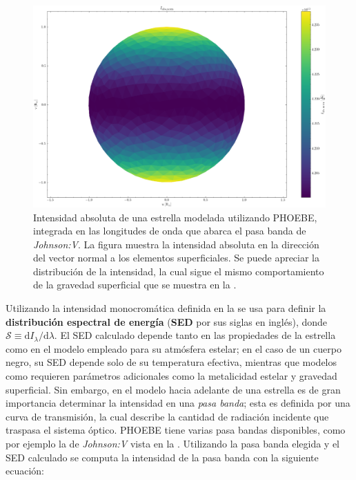 \begin{figure}[!ht]
	\centering
	\includegraphics[scale=0.4]{Introduccion/Figures/Figura PHOEBE Malla Intensidad Normal.png}
	\caption{Intensidad absoluta de una estrella modelada utilizando PHOEBE,
	integrada en las longitudes de onda que abarca el pasa banda de
	\textit{Johnson:V}. La figura muestra la intensidad absoluta en la dirección
	del vector normal a los elementos superficiales. Se puede apreciar la
	distribución de la intensidad, la cual sigue el mismo comportamiento de la
	gravedad superficial que se muestra en la
	.}
	\label{figuraMallaPhoebeIntensidadNormal}
\end{figure}

Utilizando la intensidad monocromática definida en la
 se usa para definir la
\textbf{distribución espectral de energía} (\textbf{SED} por sus siglas en
inglés), donde $\mathcal{S} \equiv \mathrm{d}I_{\lambda}/\mathrm{d}\lambda$. El
SED calculado depende tanto en las propiedades de la estrella como en el modelo
empleado para su atmósfera estelar; en el caso de un cuerpo negro, su SED
depende solo de su temperatura efectiva, mientras que modelos como
\autocite{kurucz_atlas_1970} requieren parámetros adicionales como la
metalicidad estelar y gravedad superficial. Sin embargo, en el modelo hacia
adelante de una estrella es de gran importancia determinar la intensidad en una
\textit{pasa banda}; esta es definida por una curva de transmisión, la cual
describe la cantidad de radiación incidente que traspasa el sistema óptico.
PHOEBE tiene varias pasa bandas disponibles, como por ejemplo la de
\textit{Johnson:V} vista en la .
Utilizando la pasa banda elegida y el SED calculado se computa la intensidad de
la pasa banda con la siguiente ecuación:

